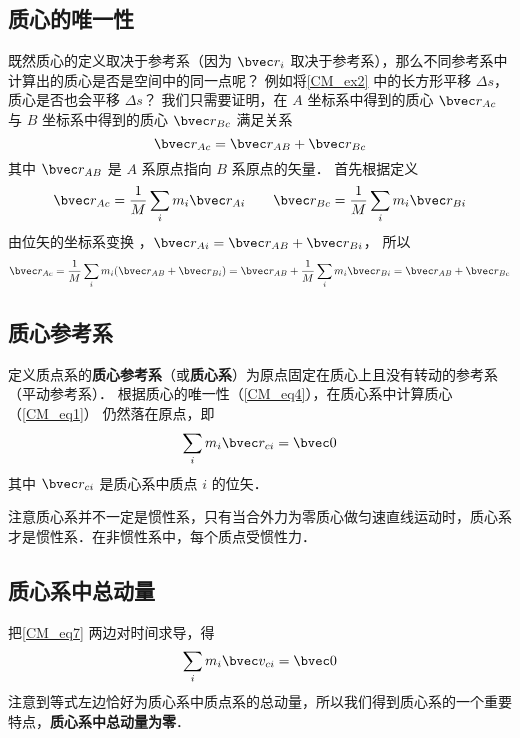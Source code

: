 \subsection{质心的唯一性}
既然质心的定义取决于参考系（因为 $\bvec r_i$ 取决于参考系），那么不同参考系中计算出的质心是否是空间中的同一点呢？ 例如将\autoref{CM_ex2} 中的长方形平移 $\Delta s$， 质心是否也会平移 $\Delta s$？ 我们只需要证明，在 $A$ 坐标系中得到的质心 $\bvec r_{Ac}$ 与 $B$ 坐标系中得到的质心 $\bvec r_{Bc}$ 满足关系
\begin{equation}\label{CM_eq4}
\bvec r_{Ac} = \bvec r_{AB} + \bvec r_{Bc}
\end{equation}
其中 $\bvec r_{AB}$ 是 $A$ 系原点指向 $B$ 系原点的矢量． 首先根据定义
\begin{equation}
\bvec r_{Ac} = \frac{1}{M}\sum_i m_i \bvec r_{Ai}  \qquad \bvec r_{Bc} = \frac{1}{M}\sum_i  m_i \bvec r_{Bi} 
\end{equation}
由位矢的坐标系变换%
，$\bvec r_{Ai} = \bvec r_{AB} + \bvec r_{Bi}$， 所以
\begin{equation}
\bvec r_{Ac} = \frac{1}{M}\sum_i m_i(\bvec r_{AB} + \bvec r_{Bi})  = \bvec r_{AB} + \frac{1}{M} \sum_i m_i \bvec r_{Bi}  = \bvec r_{AB} + \bvec r_{Bc}
\end{equation}
 
\subsection{质心参考系}
定义质点系的\textbf{质心参考系}（或\textbf{质心系}）为原点固定在质心上且没有转动的参考系（平动参考系）．%
根据质心的唯一性（\autoref{CM_eq4}），在质心系中计算质心（\autoref{CM_eq1}） 仍然落在原点，即
\begin{equation}\label{CM_eq7}
\sum_i m_i \bvec r_{ci} = \bvec 0
\end{equation}
其中 $\bvec r_{ci}$ 是质心系中质点 $i$ 的位矢．

注意质心系并不一定是惯性系，只有当合外力为零质心做匀速直线运动时，质心系才是惯性系．在非惯性系中，每个质点受惯性力．

\subsection{质心系中总动量}
把\autoref{CM_eq7} 两边对时间求导，得
\begin{equation}\label{CM_eq8}
\sum_i m_i \bvec v_{ci} = \bvec 0
\end{equation}
注意到等式左边恰好为质心系中质点系的总动量，所以我们得到质心系的一个重要特点，\textbf{质心系中总动量为零}．
